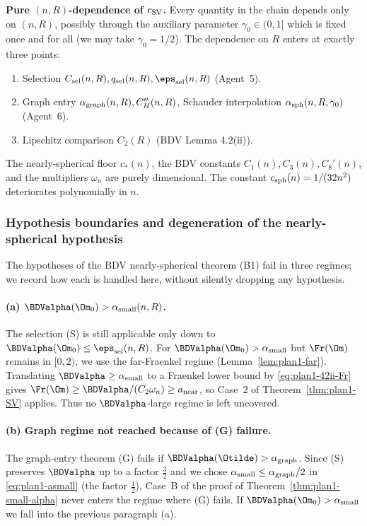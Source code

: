 \textbf{Pure $(n,R)$-dependence of $c_{\rm SV}$.}
Every quantity in the chain depends only on $(n,R)$, possibly through
the auxiliary parameter $\gamma_{0}\in(0,1]$ which is fixed once and for
all (we may take $\gamma_{0}=1/2$). The dependence on $R$ enters at
exactly three points:
\begin{enumerate}
\item Selection $C_{\rm sel}(n,R), q_{\rm sel}(n,R), \eps_{\rm sel}(n,R)$
   (Agent~5).
\item Graph entry $\alpha_{\rm graph}(n,R), C_{H}''(n,R)$,
   Schauder interpolation $\alpha_{\rm sph}(n,R,\gamma_{0})$
   (Agent~6).
\item Lipschitz comparison $C_{2}(R)$ (BDV Lemma 4.2(ii)).
\end{enumerate}
The nearly-spherical floor $c_{*}(n)$, the BDV
constants $C_{1}(n),C_{3}(n),C_{8}'(n)$, and the multipliers $\omega_{n}$
are purely dimensional. The constant $c_{\rm sph}(n)=1/(32n^{2})$
deteriorates polynomially in $n$.

\subsubsection{Hypothesis boundaries and degeneration of the
nearly-spherical hypothesis}
\label{sec:plan1-boundaries}

The hypotheses of the BDV nearly-spherical theorem (B1) fail in three
regimes; we record how each is handled here, without silently dropping
any hypothesis.

\paragraph{(a) $\BDValpha(\Om_{0})>\alpha_{\rm small}(n,R)$.}
The selection (S) is still applicable only down to
$\BDValpha(\Om_{0})\le\eps_{\rm sel}(n,R)$. For
$\BDValpha(\Om_{0})>\alpha_{\rm small}$ but $\Fr(\Om)$ remains in
$[0,2)$, we use the far-Fraenkel regime
(Lemma~\ref{lem:plan1-far}). Translating
$\BDValpha\ge\alpha_{\rm small}$ to a Fraenkel lower bound by
\eqref{eq:plan1-42ii-Fr} gives
$\Fr(\Om)\ge\BDValpha/(C_{2}\omega_{n})\ge a_{\rm near}$, so Case~2 of
Theorem~\ref{thm:plan1-SV} applies. Thus no $\BDValpha$-large regime is
left uncovered.

\paragraph{(b) Graph regime not reached because of (G) failure.}
The graph-entry theorem (G) fails if $\BDValpha(\Otilde)>\alpha_{\rm graph}$.
Since (S) preserves $\BDValpha$ up to a factor $\tfrac{3}{2}$ and we
chose $\alpha_{\rm small}\le\alpha_{\rm graph}/2$ in
\eqref{eq:plan1-asmall} (the factor $\tfrac{1}{2}$), Case~B of the proof
of Theorem~\ref{thm:plan1-small-alpha} never enters the regime where
(G) fails. If $\BDValpha(\Om_{0})>\alpha_{\rm small}$ we fall into the
previous paragraph (a).

